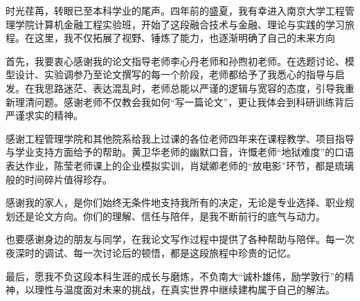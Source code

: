 \documentclass[
    type = bachelor, %
    oneside,                %
  ]{njuthesis}
\begin{document}
%   
%   









\printbibliography


\begin{acknowledgement}
  
  
时光荏苒，转眼已至本科学业的尾声。四年前的盛夏，我有幸进入南京大学工程管理学院计算机金融工程实验班，开始了这段融合技术与金融、理论与实践的学习旅程。在这里，我不仅拓展了视野、锤炼了能力，也逐渐明确了自己的未来方向

首先，我要衷心感谢我的论文指导老师李心丹老师和孙煦初老师。在选题讨论、模型设计、实验调参乃至论文撰写的每一个阶段，老师都给予了我悉心的指导与启发。在我思路迷茫、表达混乱时，老师总能以严谨的逻辑与宽容的态度，引导我重新理清问题。感谢老师不仅教会我如何“写一篇论文”，更让我体会到科研训练背后严谨求实的精神。

感谢工程管理学院和其他院系给我上过课的各位老师四年来在课程教学、项目指导与学业支持方面给予的帮助。黄卫华老师的幽默口音，许慨老师“地狱难度”的口语表达作业，陈莹老师课上的企业模拟实训，肖斌卿老师的“放电影”环节，都是琉璃般的时间碎片值得珍存。

感谢我的家人，是你们始终无条件地支持我所有的决定，无论是专业选择、职业规划还是论文方向。你们的理解、信任与陪伴，是我不断前行的底气与动力。

也要感谢身边的朋友与同学，在我论文写作过程中提供了各种帮助与陪伴。每一次夜深时的调试、每一次讨论后的顿悟，都是这段旅程中珍贵的记忆。

最后，愿我不负这段本科生涯的成长与磨炼，不负南大“诚朴雄伟，励学敦行”的精神，以理性与温度面对未来的挑战，在真实世界中继续建构属于自己的解法。
  
\end{acknowledgement}




\appendix





\end{document}
